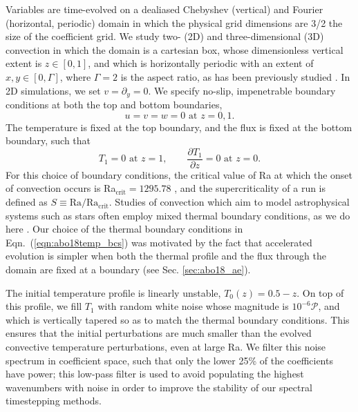 Variables are time-evolved on a dealiased Chebyshev (vertical) and Fourier (horizontal, periodic) domain in which the physical grid dimensions are 3/2 the size of the coefficient grid.  
We study two- (2D) and three-dimensional (3D) convection in which the domain is a cartesian box, whose dimensionless vertical extent is $z \in [0, 1]$, and which is horizontally periodic with an extent of $x, y \in [0, \Gamma]$, where $\Gamma = 2$ is the aspect ratio, as has been previously studied \cite{goluskin&all2014, johnston&doering2009}. 
In 2D simulations, we set $v = \partial_y = 0$.
We specify no-slip, impenetrable boundary conditions at both the top and bottom boundaries,
\begin{equation}
u = v = w = 0 \, \, \text{at}\,\,z = 0,1.
\label{eqn:abo18vel_bcs}
\end{equation}
The temperature is fixed at the top boundary, and the flux is fixed at the bottom boundary, such that
\begin{equation}
T_1 = 0 \,\,\text{at}\,\, z=1, \qquad
\frac{\partial T_1}{\partial z} = 0\,\,\text{at}\,\,z=0.
\label{eqn:abo18temp_bcs}
\end{equation}
For this choice of boundary conditions, the critical value of Ra at which the onset of convection occurs is Ra$_{\text{crit}} = 1295.78$ \cite{goluskin2016}, and the supercriticality of a run is defined as $S \equiv \text{Ra}/\text{Ra}_{\text{crit}}$.
Studies of convection which aim to model astrophysical systems such as stars often employ mixed thermal boundary conditions, as we do here \cite{hurlburt&all1984, cattaneo&all1991, korre&all2017}.
Our choice of the thermal boundary conditions in Eqn.~(\ref{eqn:abo18temp_bcs}) was motivated by the fact that accelerated evolution is simpler when both the thermal profile and the flux through the domain are fixed at a boundary (see Sec. \ref{sec:abo18_ae}).

The initial temperature profile is linearly unstable, $T_0(z) = 0.5 - z$. On top of this profile, we fill $T_1$ with random white noise whose magnitude is $10^{-6}\mathcal{P}$, and which is vertically tapered so as to match the thermal boundary conditions.
This ensures that the initial perturbations are much smaller than the evolved convective temperature perturbations, even at large Ra.
We filter this noise spectrum in coefficient space, such that only the lower 25\% of the coefficients have power; this low-pass filter is used to avoid populating the highest wavenumbers with noise in order to improve the stability of our spectral timestepping methods.


